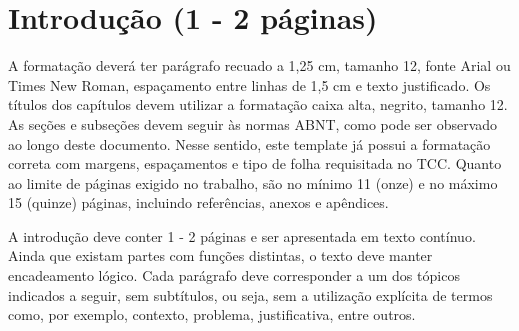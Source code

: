 \section{\esp Introdução (1 - 2 páginas)} 


A formatação deverá ter parágrafo recuado a 1,25 cm, tamanho 12, fonte Arial ou Times New Roman, espaçamento entre linhas de 1,5 cm e texto justificado. Os títulos dos capítulos devem utilizar a formatação caixa alta, negrito, tamanho 12. As seções e subseções devem seguir às normas ABNT, como pode ser observado ao longo deste documento. Nesse sentido, este template já possui a formatação correta com margens, espaçamentos e tipo de folha requisitada no TCC. Quanto ao limite de páginas exigido no trabalho, são no mínimo 11 (onze) e no máximo 15 (quinze) páginas, incluindo referências, anexos e apêndices.

A introdução deve conter 1 - 2 páginas e ser apresentada em texto contínuo. Ainda que existam partes com funções distintas, o texto deve manter encadeamento lógico. Cada parágrafo deve corresponder a um dos tópicos indicados a seguir, sem subtítulos, ou seja, sem a utilização explícita de termos como, por exemplo, contexto, problema, justificativa, entre outros.

